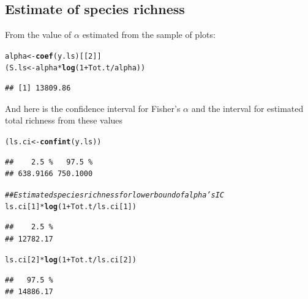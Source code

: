 \documentclass[12pt, A4]{article}\usepackage[]{graphicx}\usepackage[]{color}
\makeatletter
\newcommand{\hlnum}[1]{\textcolor[rgb]{0.686,0.059,0.569}{#1}}%
\newcommand{\hlcom}[1]{\textcolor[rgb]{0.678,0.584,0.686}{\textit{#1}}}%
\newcommand{\hlopt}[1]{\textcolor[rgb]{0,0,0}{#1}}%
\newcommand{\hlstd}[1]{\textcolor[rgb]{0.345,0.345,0.345}{#1}}%
\newcommand{\hlkwb}[1]{\textcolor[rgb]{0.69,0.353,0.396}{#1}}%
\newcommand{\hlkwd}[1]{\textcolor[rgb]{0.737,0.353,0.396}{\textbf{#1}}}%
\newenvironment{kframe}{%
 \def\at@end@of@kframe{}%
 \ifinner\ifhmode%
  \def\at@end@of@kframe{\end{minipage}}%
  \begin{minipage}{\columnwidth}%
 \fi\fi%
 \def\FrameCommand##1{\hskip\@totalleftmargin \hskip-\fboxsep
 \colorbox{shadecolor}{##1}\hskip-\fboxsep
     \hskip-\linewidth \hskip-\@totalleftmargin \hskip\columnwidth}%
 \MakeFramed {\advance\hsize-\width
   \@totalleftmargin\z@ \linewidth\hsize
   \@setminipage}}%
 {\par\unskip\endMakeFramed%
 \at@end@of@kframe}
\newenvironment{knitrout}{}{} %
\makeatother
\begin{document}
\subsection*{Estimate of species richness}

From the value of $\alpha$ estimated from the sample of plots:
 
\begin{knitrout}
\color{fgcolor}\begin{kframe}
\begin{alltt}
\hlstd{alpha} \hlkwb{<-} \hlkwd{coef}\hlstd{(y.ls)[[}\hlnum{2}\hlstd{]]}
\hlstd{(S.ls} \hlkwb{<-} \hlstd{alpha}\hlopt{*}\hlkwd{log}\hlstd{(}\hlnum{1} \hlopt{+} \hlstd{Tot.t}\hlopt{/}\hlstd{alpha))}
\end{alltt}
\begin{verbatim}
## [1] 13809.86
\end{verbatim}
\end{kframe}
\end{knitrout}

And here is the confidence interval for Fisher's $\alpha$ and the
interval for estimated total richness from these values

\begin{knitrout}
\color{fgcolor}\begin{kframe}
\begin{alltt}
\hlstd{(ls.ci} \hlkwb{<-} \hlkwd{confint}\hlstd{(y.ls))}
\end{alltt}
\begin{verbatim}
##    2.5 %   97.5 % 
## 638.9166 750.1000
\end{verbatim}
\begin{alltt}
\hlcom{## Estimated species richness for lower bound of alpha's IC}
\hlstd{ls.ci[}\hlnum{1}\hlstd{]}\hlopt{*}\hlkwd{log}\hlstd{(}\hlnum{1} \hlopt{+} \hlstd{Tot.t}\hlopt{/}\hlstd{ls.ci[}\hlnum{1}\hlstd{])}
\end{alltt}
\begin{verbatim}
##    2.5 % 
## 12782.17
\end{verbatim}
\begin{alltt}
\hlstd{ls.ci[}\hlnum{2}\hlstd{]}\hlopt{*}\hlkwd{log}\hlstd{(}\hlnum{1} \hlopt{+} \hlstd{Tot.t}\hlopt{/}\hlstd{ls.ci[}\hlnum{2}\hlstd{])}
\end{alltt}
\begin{verbatim}
##   97.5 % 
## 14886.17
\end{verbatim}
\end{kframe}
\end{knitrout}
\end{document}
